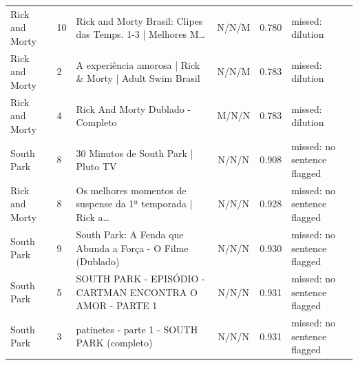 \begin{table}[!t]
\begin{tabular}{@{}llp{}ccl@{}}
Rick and Morty & 10 & Rick and Morty Brasil: Clipes das Temps. 1-3 | Melhores M… & N/N/M & 0.780 & missed: dilution \\
Rick and Morty & 2 & A experiência amorosa | Rick \& Morty | Adult Swim Brasil & N/N/M & 0.783 & missed: dilution \\
Rick and Morty & 4 & Rick And Morty Dublado - Completo & M/N/N & 0.783 & missed: dilution \\
South Park & 8 & 30 Minutos de South Park | Pluto TV & N/N/N & 0.908 & missed: no sentence flagged \\
Rick and Morty & 8 & Os melhores momentos de suspense da 1ª temporada | Rick a… & N/N/N & 0.928 & missed: no sentence flagged \\
South Park & 9 & South Park: A Fenda que Abunda a Força - O Filme (Dublado) & N/N/N & 0.930 & missed: no sentence flagged \\
South Park & 5 & SOUTH PARK - EPISÓDIO - CARTMAN ENCONTRA O AMOR - PARTE 1 & N/N/N & 0.931 & missed: no sentence flagged \\
South Park & 3 & patinetes - parte 1 - SOUTH PARK (completo) & N/N/N & 0.931 & missed: no sentence flagged \\
\bottomrule
\end{tabular}
\end{table}
